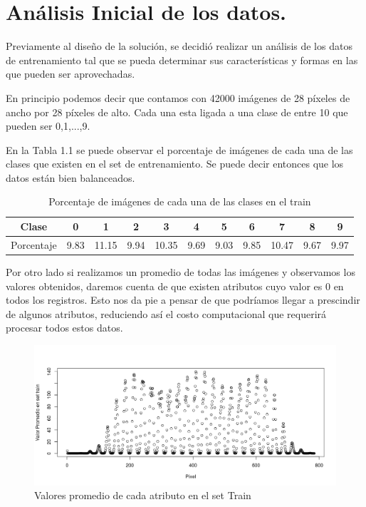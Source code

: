 \chapter{Análisis Inicial de los datos.}
Previamente al diseño de la solución, se decidió realizar un análisis de los datos de entrenamiento tal que se pueda determinar sus características y formas en las que pueden ser aprovechadas.

En principio podemos decir que contamos con 42000 imágenes de 28 píxeles de ancho por 28 píxeles de alto. Cada una esta ligada a una clase de entre 10 que pueden ser 0,1,...,9. 

En la Tabla 1.1 se puede observar el porcentaje de imágenes de cada una de las clases que existen en el set de entrenamiento. Se puede decir entonces que los datos están bien balanceados.

\begin{table}[htp]
  \caption{Porcentaje de imágenes de cada una de las clases en el train}
  \label{porc}

  \begin{center}
    \begin{tabular}{|c|c|c|c|c|c|c|c|c|c|c|}
    \hline
      Clase&0&1&2&3&4&5&6&7&8&9 \\
    \hline
      Porcentaje&9.83&11.15&9.94&10.35&9.69&9.03&9.85&10.47&9.67&9.97 \\
    \hline
    \end{tabular}
  \end{center}
\end{table}

Por otro lado si realizamos un promedio de todas las imágenes y observamos los valores obtenidos, daremos cuenta de que existen atributos cuyo valor es 0 en todos los registros. Esto nos da pie a pensar de que podríamos llegar a prescindir de algunos atributos, reduciendo así el costo computacional que requerirá procesar todos estos datos.
\begin{figure}[htp]
  \begin{center}
    \includegraphics[width=15cm]{Rplot.jpeg}
    \caption{Valores promedio de cada atributo en el set Train}
    \label{plot1}
  \end{center}
\end{figure}

